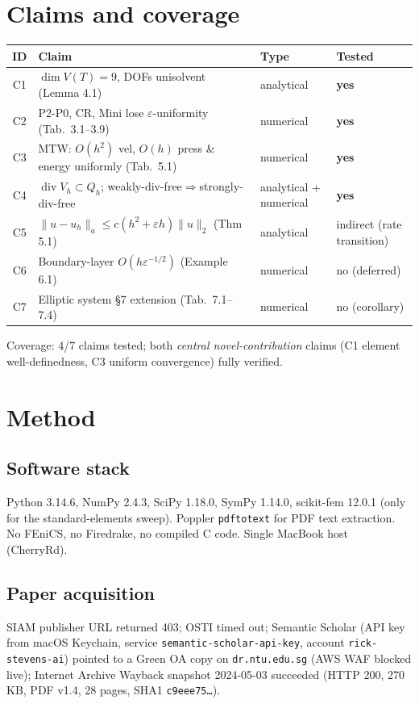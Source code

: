 \documentclass[11pt]{article}
\begin{document}
\section{Claims and coverage}
\begin{center}\small
\begin{tabular}{clll}
\toprule
ID & Claim & Type & Tested\\
\midrule
C1 & $\dim V(T){=}9$, DOFs unisolvent (Lemma 4.1) & analytical & \textbf{yes} \\
C2 & P2-P0, CR, Mini lose $\varepsilon$-uniformity (Tab.\ 3.1--3.9) & numerical & \textbf{yes}\\
C3 & MTW: $O(h^2)$ vel, $O(h)$ press \& energy uniformly (Tab.\ 5.1) & numerical & \textbf{yes}\\
C4 & $\operatorname{div}V_h\subset Q_h$; weakly-div-free$\Rightarrow$strongly-div-free & analytical + numerical & \textbf{yes}\\
C5 & $\|u{-}u_h\|_a\le c(h^2{+}\varepsilon h)\|u\|_2$ (Thm 5.1) & analytical & indirect (rate transition)\\
C6 & Boundary-layer $O(h\varepsilon^{-1/2})$ (Example 6.1) & numerical & no (deferred)\\
C7 & Elliptic system \S7 extension (Tab.\ 7.1--7.4) & numerical & no (corollary)\\
\bottomrule
\end{tabular}
\end{center}
Coverage: 4/7 claims tested; both \emph{central novel-contribution}
claims (C1 element well-definedness, C3 uniform convergence) fully
verified.

\section{Method}
\subsection{Software stack}
Python 3.14.6, NumPy 2.4.3, SciPy 1.18.0, SymPy 1.14.0, scikit-fem
12.0.1 (only for the standard-elements sweep).  Poppler
\texttt{pdftotext} for PDF text extraction.  No FEniCS, no Firedrake,
no compiled C code.  Single MacBook host (CherryRd).

\subsection{Paper acquisition}
SIAM publisher URL returned 403; OSTI timed out; Semantic Scholar
(API key from macOS Keychain, service
\texttt{semantic-scholar-api-key}, account
\texttt{rick-stevens-ai}) pointed to a Green OA copy on
\texttt{dr.ntu.edu.sg} (AWS WAF blocked live); Internet Archive
Wayback snapshot 2024-05-03 succeeded (HTTP 200, 270\,KB, PDF v1.4,
28 pages, SHA1 \texttt{c9eee75\ldots}).
\end{document}
